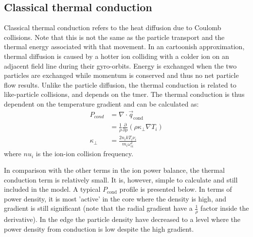 \begin{refsection}

\subsection{Classical thermal conduction}\label{sec:thermal_cond}

Classical thermal conduction refers to the heat diffusion due to Coulomb collisions. Note that this is not the same as the particle transport and the thermal energy associated with that movement. In an cartoonish approximation, thermal diffusion is caused by a hotter ion colliding with a colder ion on an adjacent field line during their gyro-orbits. Energy is exchanged when the two particles are exchanged while momentum is conserved and thus no net particle flow results. Unlike the particle diffusion, the thermal conduction is related to like-particle collisions, and depends on the tmer. The thermal conduction is thus dependent on the temperature gradient and can be calculated as\cite{Shafranov1966}:
\begin{align}
    P_{cond} &= \nabla\cdot\vec{q}_{\text{cond}} \\
    &= \frac{1}{\rho}\frac{\partial}{\partial\rho}(\rho\kappa_{\perp}\nabla T_{i})\\
    \kappa_{\perp} &= \frac{2n_ikT_i\nu_i}{m_i\omega_{ci}^2}
\end{align}
where $nu_i$ is the ion-ion collision frequency.

In comparison with the other terms in the ion power balance, the thermal conduction term is relatively small. It is, however, simple to calculate and still included in the model. A typical $P_{\text{cond}}$ profile is presented below. In terms of power density, it is most 'active' in the core where the density is high, and gradient is still significant (note that the radial gradient have a $\frac{1}{\rho}$ factor inside the derivative). In the edge the particle density have decreased to a level where the power density from conduction is low despite the high gradient.


\end{refsection}
